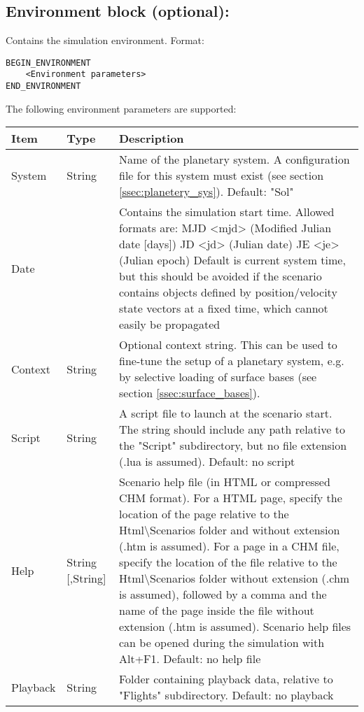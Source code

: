 \documentclass[Orbiter Developer Manual.tex]{subfiles}
\begin{document}
\subsection*{Environment block (optional):}
Contains the simulation environment. Format:

\begin{lstlisting}[language=OSFS]
BEGIN_ENVIRONMENT
	<Environment parameters>
END_ENVIRONMENT
\end{lstlisting}

\noindent
The following environment parameters are supported:

\begin{table}[H]
	\centering
	\begin{tabularx}{\textwidth}{ |l|l|X| }
	\hline\rule{0pt}{2ex}
	\textbf{Item} & \textbf{Type} & \textbf{Description}\\
	\hline\rule{0pt}{2ex}
	System & String & Name of the planetary system. A configuration file for this system must exist (see section \ref{ssec:planetery_sys}). Default: "Sol"\\
	\hline\rule{0pt}{2ex}
	Date &   & Contains the simulation start time. Allowed formats are:\newline
	MJD <mjd> (Modified Julian date [days])\newline
	JD <jd> (Julian date)\newline
	JE <je> (Julian epoch)\newline
	Default is current system time, but this should be avoided if the scenario contains objects defined by position/velocity  state vectors at a fixed time, which cannot easily be propagated\\
	\hline\rule{0pt}{2ex}
	Context & String & Optional context string. This can be used to fine-tune the setup of a planetary system, e.g. by selective loading of surface bases (see section \ref{ssec:surface_bases}).\\
	\hline\rule{0pt}{2ex}
	Script & String & A script file to launch at the scenario start. The string should include any path relative to the "Script" subdirectory, but no file extension (.lua is assumed). Default: no script\\
	\hline\rule{0pt}{2ex}
	Help & String [,String] & Scenario help file (in HTML or compressed CHM format). For a HTML page, specify the location of the page relative to the Html\textbackslash Scenarios folder and without extension (.htm is assumed). For a page in a CHM file, specify the location of the file relative to the Html\textbackslash Scenarios folder without extension (.chm is assumed), followed by a comma and the name of the page inside the file without extension (.htm is assumed). Scenario help files can be opened during the simulation with Alt+F1. Default: no help file\\
	\hline\rule{0pt}{2ex}
	Playback & String & Folder containing playback data, relative to "Flights" subdirectory. Default: no playback\\
	\hline
	\end{tabularx}
\end{table}
\end{document}
